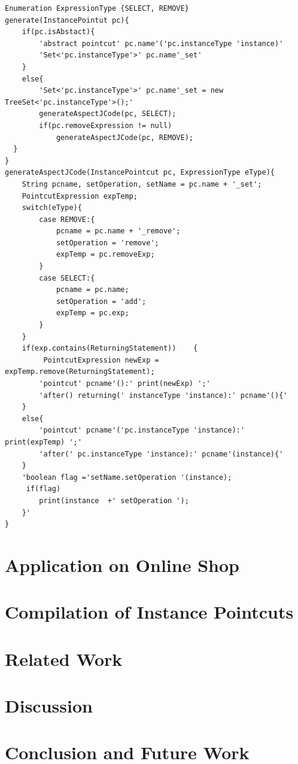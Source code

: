 \documentclass{llncs}
\begin{document}
\begin{lstlisting}[float=H, caption={Code generation templates for instance pointcut to AspectJ generation }, label={lst:ip2aj}]
Enumeration ExpressionType {SELECT, REMOVE}
generate(InstancePointut pc){
	if(pc.isAbstact){
		'abstract pointcut' pc.name'('pc.instanceType 'instance)'
		'Set<'pc.instanceType'>' pc.name'_set'
	}
	else{
		'Set<'pc.instanceType'>' pc.name'_set = new TreeSet<'pc.instanceType'>();'
		generateAspectJCode(pc, SELECT);
		if(pc.removeExpression != null)
			generateAspectJCode(pc, REMOVE);
  }
}	
generateAspectJCode(InstancePointcut pc, ExpressionType eType){
	String pcname, setOperation, setName = pc.name + '_set';
	PointcutExpression expTemp;
	switch(eType){
		case REMOVE:{
			pcname = pc.name + '_remove';
			setOperation = 'remove';
			expTemp = pc.removeExp;
		}
		case SELECT:{
			pcname = pc.name;
			setOperation = 'add';
			expTemp = pc.exp;
		}
	}	
	if(exp.contains(ReturningStatement))	{
		 PointcutExpression newExp = expTemp.remove(ReturningStatement);	
		'pointcut' pcname'():' print(newExp) ';'
		'after() returning(' instanceType 'instance):' pcname'(){'		
	}
	else{
		'pointcut' pcname'('pc.instanceType 'instance):' print(expTemp) ';'
		'after(' pc.instanceType 'instance):' pcname'(instance){'	
	}
	'boolean flag ='setName.setOperation '(instance);
	 if(flag)
		print(instance  +' setOperation ');
	}'
}
\end{lstlisting}

\section{Application on Online Shop}

\section{Compilation of Instance Pointcuts}

\section{Related Work}
\section{Discussion}
\section{Conclusion and Future Work}
\end{document}
